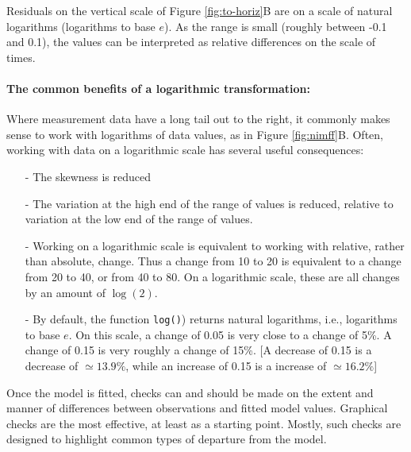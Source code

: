\documentclass{tufte-book}\usepackage[]{graphicx}\usepackage[]{color}
\newcommand{\txtt}[1]{\texttt{#1}}
\begin{document}
Residuals on the vertical scale of Figure \ref{fig:to-horiz}B are on a
scale of natural logarithms (logarithms to base $e$).  As the range is
small (roughly between -0.1 and 0.1), the values can be interpreted as relative
differences on the scale of times.


\paragraph{The common benefits of a logarithmic transformation:}

Where measurement data have a long tail out to the right, it
commonly makes sense to work with logarithms of data values, as in Figure
\ref{fig:nimff}B.  Often, working with data on a logarithmic
scale has several useful consequences:
\begin{itemize}
  \item[-] The skewness is reduced
  \item[-] The variation at the high end of the range of values is reduced,
    relative to variation at the low end of the range of values.
  \item[-] Working on a logarithmic scale is equivalent to working
    with relative, rather than absolute, change.  Thus a change from
    10 to 20 is equivalent to a change from 20 to 40, or from 40 to 80.
    On a logarithmic scale, these are all changes by an amount of
    $\log(2)$.
  \item[-] By default, the function \txtt{log()}) returns natural
    logarithms, i.e., logarithms to base $e$.  On this scale, a change
    of 0.05 is very close to a change of 5\%.  A change of 0.15 is
    very roughly a change of 15\%.  [A decrease of 0.15 is a decrease
    of $\simeq 13.9\%$, while an increase of 0.15 is a increase of
    $\simeq 16.2\%$]
\end{itemize}

Once the model is fitted, checks can and should be made on the extent
and manner of differences between observations and fitted model
values.  Graphical checks are the most effective, at least as a starting
point. Mostly, such checks are designed to highlight common types of
departure from the model.
\end{document}
